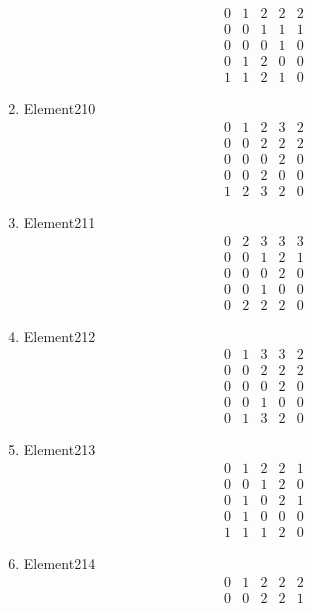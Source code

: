 \documentclass[12pt]{article}
\begin{document}
\begin{multicols}{3}
\begin{enumerate}
\begin{equation*}
\begin{array}{ccccc}
0&1&2&2&2\\
0&0&1&1&1\\
0&0&0&1&0\\
0&1&2&0&0\\
1&1&2&1&0
\end{array}
\end{equation*}
\item Element210
\begin{equation*}
\begin{array}{ccccc}
0&1&2&3&2\\
0&0&2&2&2\\
0&0&0&2&0\\
0&0&2&0&0\\
1&2&3&2&0
\end{array}
\end{equation*}
\item Element211
\begin{equation*}
\begin{array}{ccccc}
0&2&3&3&3\\
0&0&1&2&1\\
0&0&0&2&0\\
0&0&1&0&0\\
0&2&2&2&0
\end{array}
\end{equation*}
\item Element212
\begin{equation*}
\begin{array}{ccccc}
0&1&3&3&2\\
0&0&2&2&2\\
0&0&0&2&0\\
0&0&1&0&0\\
0&1&3&2&0
\end{array}
\end{equation*}
\item Element213
\begin{equation*}
\begin{array}{ccccc}
0&1&2&2&1\\
0&0&1&2&0\\
0&1&0&2&1\\
0&1&0&0&0\\
1&1&1&2&0
\end{array}
\end{equation*}
\item Element214
\begin{equation*}
\begin{array}{ccccc}
0&1&2&2&2\\
0&0&2&2&1\\

\end{array}
\end{equation*}
\end{enumerate}
\end{multicols}
\end{document}
